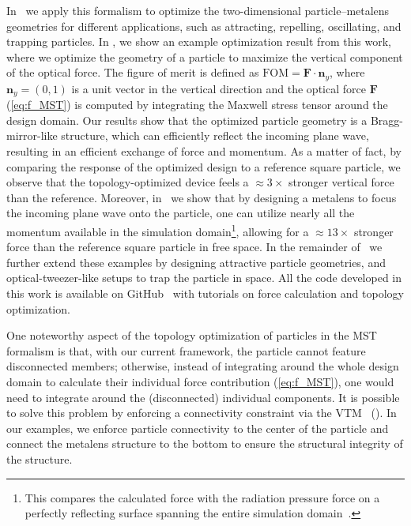 In~\cite{ownpub2} we apply this formalism to optimize the two-dimensional particle--metalens geometries for different applications, such as attracting, repelling, 
oscillating, and trapping particles. In , we show an example optimization result from this work, where we optimize the geometry of a particle to maximize the vertical component of the optical force. 
The figure of merit is defined as $\text{FOM} = \mathbf{F} \cdot \mathbf{n}_y$, where $\mathbf{n}_y = (0, 1)$ is a unit vector in the vertical direction and 
the optical force $\mathbf{F}$ (\eqref{eq:f_MST}) is computed by integrating the Maxwell stress tensor around the design domain. Our results show that the optimized particle geometry is a Bragg-mirror-like
structure, which can efficiently reflect the incoming plane wave, resulting in an efficient exchange of force and momentum. As a matter of fact, by comparing the response of the optimized design
to a reference square particle, we observe that the topology-optimized device feels a $\approx 3\times$ stronger vertical force than the reference.
 Moreover, in~\cite{ownpub2} we show that by designing a metalens to focus the incoming plane wave onto the particle, one can utilize nearly all the momentum available in the simulation domain\footnote{This compares the calculated force with the radiation pressure force on a perfectly reflecting surface spanning the entire simulation domain~\cite{ownpub2}.},
 allowing for a $\approx 13\times$ stronger force than the reference square particle in free space. 
 In the remainder of~\cite{ownpub2} we further extend these examples by designing
attractive particle geometries, and optical-tweezer-like setups to trap the particle in space. All the code developed in this work is available on GitHub~\cite{github_MST} with tutorials on force calculation and topology optimization. 

One noteworthy aspect of the topology optimization of particles in the MST formalism is that, with our current framework, the particle cannot feature disconnected members; otherwise, instead of integrating around the whole design domain to calculate their individual force contribution (\eqref{eq:f_MST}),
one would need to integrate around the (disconnected) individual components. It is possible to solve this problem by enforcing 
a connectivity constraint via the VTM~\cite{li_structural_2016} (). In our examples,
we enforce particle connectivity to the center of the particle and connect the metalens structure to the bottom to ensure the structural
integrity of the structure.

